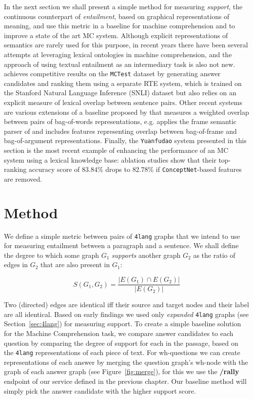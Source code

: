 In the next section we shall present a simple method for measuring
\textit{support}, the continuous counterpart of \textit{entailment},
based on graphical representations of meaning, and use this metric in a
baseline for machine comprehension and to improve a state of the art
MC system.
Although explicit representations of semantics are rarely used for this purpose,
in recent years there have been several attempts at leveraging lexical
ontologies in machine comprehension, and the approach of using textual
entailment as an intermediary task is also not new. \cite{Wang:2016}
achieves competitive results on the \texttt{MCTest} dataset
\cite{Richardson:2013} by generating
answer candidates and ranking them using a separate RTE system, which is
trained on the Stanford Natural Language Inference (SNLI) dataset
\cite{Bowman:2015}
but also relies on an explicit measure of lexical overlap between sentence
pairs. Other recent systems are various extensions of a baseline
proposed by \cite{Richardson:2013} that measures a weighted overlap
between pairs of bag-of-words representations, e.g. \cite{Wang:2015b}
applies the frame
semantic parser of \cite{Das:2010} and includes features representing
overlap between bag-of-frame and bag-of-argument representations.
Finally, the \texttt{Yuanfudao} system presented in this section is the most
recent example of enhancing the performance of an MC system using a lexical
knowledge base: ablation studies show that their top-ranking accuracy score of
$83.84\%$ drops to $82.78\%$ if \texttt{ConceptNet}-based features are removed.

\section{Method}
\label{sec:method}

We define a simple metric between pairs of \texttt{4lang} graphs that
we intend to use for measuring entailment between a paragraph and a
sentence. We shall define the degree to which some graph $G_1$
\textit{supports} another graph $G_2$ as the ratio of edges in $G_2$
that are also present in $G_1$:

\[ S(G_1, G_2) =\frac{|E(G_1)\cap E(G_2)|}{|E(G_2)|}\]

Two (directed) edges are identical iff their source
and target nodes and their label are all identical. Based on early
findings we used only \textit{expanded} \texttt{4lang} graphs (see
Section~\ref{sec:4lang}) for measuring support. 
To create a simple baseline solution for the Machine Comprehension task,
we compare answer candidates to each question by comparing the degree of
support for each in the passage, based on the \texttt{4lang} representations of
each piece of text. For wh-questions we can create representations of
each answer by merging the question graph's wh-node with the graph of
each answer graph (see Figure~\ref{fig:merge}), for this we use the \textbf{/rally} endpoint of our service defined in the previous chapter. Our baseline method will simply
pick the answer candidate with the higher support score.

